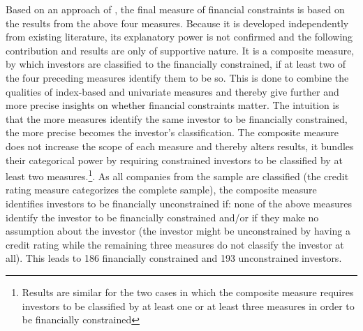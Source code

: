 \documentclass[12pt]{article}
\begin{document}
Based on an approach of \citet[p.1188]{Campello2006}, the final measure of financial constraints is based on the results from the above four measures. Because it is developed independently from existing literature, its explanatory power is not confirmed and the following contribution and results are only of supportive nature. It is a composite measure, by which investors are classified to the financially constrained, if at least two of the four preceding measures identify them to be so. This is done to combine the qualities of index-based and univariate measures and thereby give further and more precise insights on whether financial constraints matter. The intuition is that the more measures identify the same investor to be financially constrained, the more precise becomes the investor's classification. The composite measure does not increase the scope of each measure and thereby alters results, it bundles their categorical power by requiring constrained investors to be classified by at least two measures.\footnote{Results are similar for the two cases in which the composite measure requires investors to be classified by at least one or at least three measures in order to be financially constrained}.
As all companies from the sample are classified (the credit rating measure categorizes the complete sample), the composite measure identifies investors to be financially unconstrained if: none of the above measures identify the investor to be financially constrained and/or if they make no assumption about the investor (the investor might be unconstrained by having a credit rating while the remaining three measures do not classify the investor at all). This leads to 186 financially constrained and 193 unconstrained investors.\par
\end{document}
